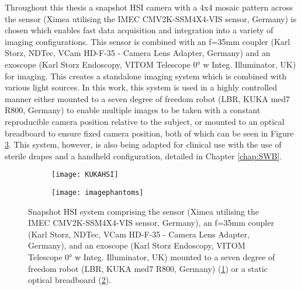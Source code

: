 Throughout this thesis a snapshot HSI camera with a 4x4 mosaic pattern across the sensor (Ximea utilising the IMEC CMV2K-SSM4X4-VIS sensor, Germany) is chosen which enables fast data acquisition and integration into a variety of imaging configurations. This sensor is combined with an f=35mm coupler (Karl Storz, NDTec, VCam HD-F-35 - Camera Lens Adapter, Germany) and an exoscope (Karl Storz Endoscopy, VITOM Telescope 0° w Integ. Illuminator, UK) for imaging. This creates a standalone imaging system which is combined with various light sources. In this work, this system is used in a highly controlled manner either mounted to a seven degree of freedom robot (LBR, KUKA med7 R800, Germany) to enable multiple images to be taken with a constant reproducible camera position relative to the subject, or mounted to an optical breadboard to ensure fixed camera position, both of which can be seen in Figure \ref{fig:HSIsetups}. This system, however, is also being adapted for clinical use with the use of sterile drapes and a handheld configuration, detailed in Chapter \ref{chap:SWB}. %
\begin{figure}[h]
    \centering 
    \begin{subfigure}[ht!]{0.27\textwidth}
	\texttt{[image: KUKAHSI]}
	\caption{}
	\label{fig:KUKAHSI}
    \end{subfigure}
    \begin{subfigure}[ht!]{0.16\textwidth}
        \texttt{[image: imagephantoms]}
        \caption{}
        \label{fig:ScopeHSI}
    \end{subfigure}
    \caption{Snapshot HSI system comprising the sensor (Ximea utilising the IMEC CMV2K-SSM4X4-VIS sensor, Germany), an f=35mm coupler (Karl Storz, NDTec, VCam HD-F-35 - Camera Lens Adapter, Germany), and an exoscope (Karl Storz Endoscopy, VITOM Telescope 0° w Integ. Illuminator, UK) mounted to a seven degree of freedom robot (LBR, KUKA med7 R800, Germany) (\ref{fig:KUKAHSI}) or a static optical breadboard (\ref{fig:ScopeHSI}).}
    \label{fig:HSIsetups}
\end{figure}
%

